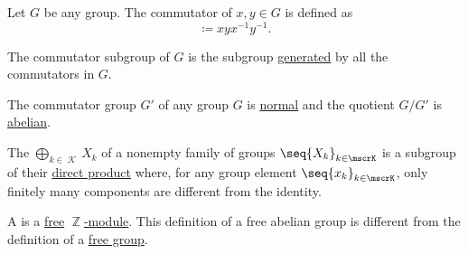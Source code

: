 \begin{definition}\label{def:group_commutator}
  Let \( G \) be any group. The commutator of \( x, y \in G \) is defined as
  \begin{equation*}
    [x, y] \coloneqq xyx^{-1}y^{-1}.
  \end{equation*}

  The commutator subgroup of \( G \) is the subgroup \hyperref[def:group_presentation]{generated} by all the commutators in \( G \).
\end{definition}

\begin{proposition}\label{thm:quotient_by_commutator_subgroup}
  The commutator group \( G' \) of any group \( G \) is \hyperref[def:normal_subgroup]{normal} and the quotient \( G / G' \) is \hyperref[def:abelian_group]{abelian}.
\end{proposition}

\begin{definition}\label{def:group_direct_sum}
  The  \( \bigoplus_{k \in \mscrK} X_k \) of a nonempty family of groups \( \seq{ X_k }_{k \in \mscrK} \) is a subgroup of their \hyperref[def:group_direct_sum]{direct product} where, for any group element \( \seq{ x_k }_{k \in \mscrK} \), only finitely many components are different from the identity.
\end{definition}

\begin{definition}\label{def:free_abelian_group}
  A  is a \hyperref[def:free_left_module]{free} \hyperref[thm:abelian_group_iff_z_module]{\( \BbbZ \)-module}. This definition of a free abelian group is different from the definition of a \hyperref[def:free_group]{free group}.
\end{definition}
